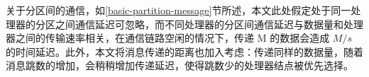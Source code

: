 关于分区间的通信，如\ref{basic-partition-message}节所述，本文此处假定处于同一处理器的分区之间通信延迟可忽略，而不同处理器的分区间通信延迟与数据量和处理器之间的传输速率相关，在通信链路空闲的情况下，传递 M 的数据会造成 $M/s$ 的时间延迟。此外，本文将消息传递的距离也加入考虑：传递同样的数据量，随着消息跳数的增加，会稍稍增加传递延迟，使得跳数少的处理器结点被优先选择。
%
%
%
%
%
%
%

